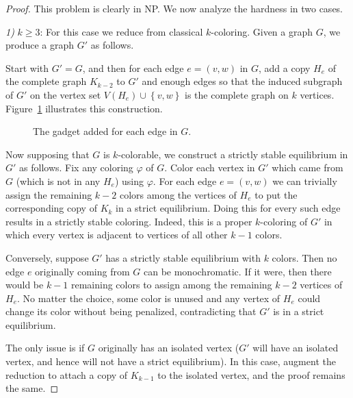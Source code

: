 \documentclass{llncs}
\begin{document}
\begin{proof}
This problem is clearly in NP.  We now analyze the hardness
in two cases.

\noindent \emph{1)} $k\ge3$:
For this case we reduce from classical $k$-coloring. 
Given a graph $G$, we produce a graph $G'$ as follows.

Start with $G' = G$, and then for each edge $e = (v,w)$ in $G$, add a copy
$H_e$ of the complete graph $K_{k-2}$ to $G'$ and enough edges so that the
induced subgraph of $G'$ on the vertex set $V(H_e) \cup \left \{ v,w \right \}$
is the complete graph on $k$ vertices. Figure~\ref{fig:edgegadget} illustrates this
construction.

\begin{figure}[htb]
\centering
{}
\caption{The gadget added for each edge in $G$.}
\label{fig:edgegadget}
\end{figure}

Now supposing that $G$ is $k$-colorable, we construct a strictly stable
equilibrium in $G'$ as follows. Fix any coloring $\varphi$ of $G$. Color each
vertex in $G'$ which came from $G$ (which is not in any $H_e$) using $\varphi$.
For each edge $e = (v,w)$ we can trivially assign the remaining $k-2$ colors
among the vertices of $H_e$ to put the corresponding copy of $K_k$ in a strict
equilibrium. Doing this for every such edge results in a strictly stable
coloring. Indeed, this is a proper $k$-coloring of $G'$ in which every vertex
is adjacent to vertices of all other $k-1$ colors.

Conversely, suppose $G'$ has a strictly stable equilibrium with $k$ colors.
Then no edge $e$ originally coming from $G$ can be monochromatic. If it were,
then there would be $k-1$ remaining colors to assign among the remaining $k-2$
vertices of $H_e$. No matter the choice, some color is unused and any vertex
of $H_e$ could change its color without being penalized, contradicting that
$G'$ is in a strict equilibrium.

The only issue is if $G$ originally has an isolated vertex ($G'$ will have an
isolated vertex, and hence will not have a strict equilibrium). In this case,
augment the reduction to attach a copy of $K_{k-1}$ to the isolated vertex, and
the proof remains the same.


\end{proof}
\end{document}
